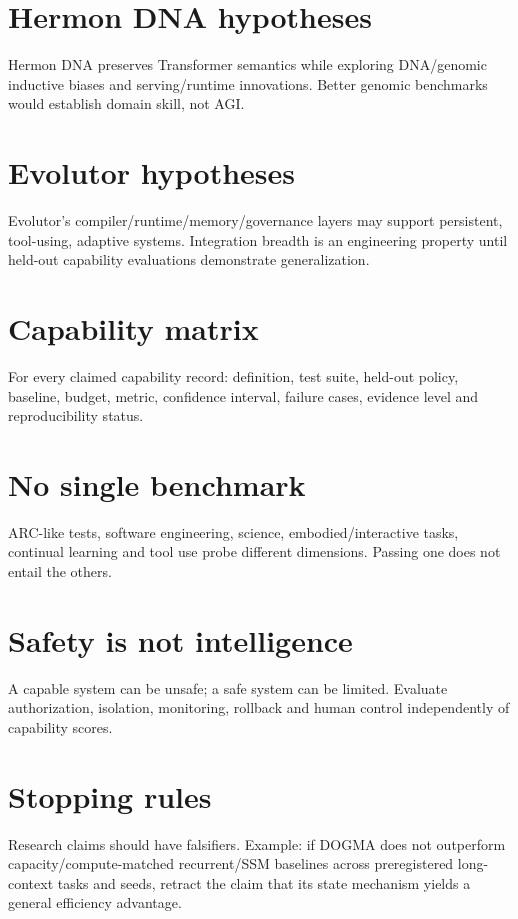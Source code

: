 \section{Hermon DNA hypotheses}
Hermon DNA preserves Transformer semantics while exploring DNA/genomic inductive biases and serving/runtime innovations. Better genomic benchmarks would establish domain skill, not AGI.

\section{Evolutor hypotheses}
Evolutor's compiler/runtime/memory/governance layers may support persistent, tool-using, adaptive systems. Integration breadth is an engineering property until held-out capability evaluations demonstrate generalization.

\section{Capability matrix}
For every claimed capability record: definition, test suite, held-out policy, baseline, budget, metric, confidence interval, failure cases, evidence level and reproducibility status.

\section{No single benchmark}
ARC-like tests, software engineering, science, embodied/interactive tasks, continual learning and tool use probe different dimensions. Passing one does not entail the others.

\section{Safety is not intelligence}
A capable system can be unsafe; a safe system can be limited. Evaluate authorization, isolation, monitoring, rollback and human control independently of capability scores.

\section{Stopping rules}
Research claims should have falsifiers. Example: if DOGMA does not outperform capacity/compute-matched recurrent/SSM baselines across preregistered long-context tasks and seeds, retract the claim that its state mechanism yields a general efficiency advantage.

